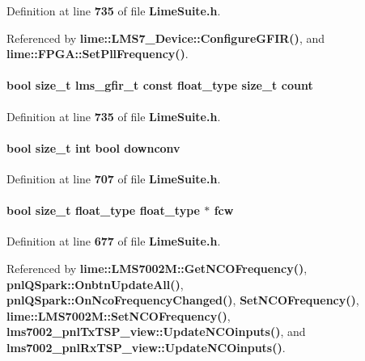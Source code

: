 Definition at line {\bf 735} of file {\bf Lime\+Suite.\+h}.



Referenced by {\bf lime\+::\+L\+M\+S7\+\_\+\+Device\+::\+Configure\+G\+F\+I\+R()}, and {\bf lime\+::\+F\+P\+G\+A\+::\+Set\+Pll\+Frequency()}.

\paragraph[{count}]{\setlength{\rightskip}{0pt plus 5cm}bool size\+\_\+t {\bf lms\+\_\+gfir\+\_\+t} const {\bf float\+\_\+type} size\+\_\+t {\bf count}}\label{group__FN__ADVANCED_ga86a6099fd14f2c337e39bf0b8da0546d}


Definition at line {\bf 735} of file {\bf Lime\+Suite.\+h}.

\paragraph[{downconv}]{\setlength{\rightskip}{0pt plus 5cm}bool size\+\_\+t {\bf int} bool downconv}\label{group__FN__ADVANCED_ga18a93efe2dba2a2ee7e687dd6e7d0d7c}


Definition at line {\bf 707} of file {\bf Lime\+Suite.\+h}.

\paragraph[{fcw}]{\setlength{\rightskip}{0pt plus 5cm}bool size\+\_\+t {\bf float\+\_\+type} {\bf float\+\_\+type} $\ast$ fcw}\label{group__FN__ADVANCED_gaa9b5e3201a9877f3475e98f944d30d6d}


Definition at line {\bf 677} of file {\bf Lime\+Suite.\+h}.



Referenced by {\bf lime\+::\+L\+M\+S7002\+M\+::\+Get\+N\+C\+O\+Frequency()}, {\bf pnl\+Q\+Spark\+::\+Onbtn\+Update\+All()}, {\bf pnl\+Q\+Spark\+::\+On\+Nco\+Frequency\+Changed()}, {\bf Set\+N\+C\+O\+Frequency()}, {\bf lime\+::\+L\+M\+S7002\+M\+::\+Set\+N\+C\+O\+Frequency()}, {\bf lms7002\+\_\+pnl\+Tx\+T\+S\+P\+\_\+view\+::\+Update\+N\+C\+Oinputs()}, and {\bf lms7002\+\_\+pnl\+Rx\+T\+S\+P\+\_\+view\+::\+Update\+N\+C\+Oinputs()}.

